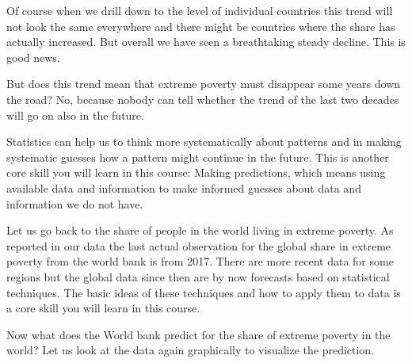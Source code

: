 \documentclass[
  letterpaper,
]{scrbook}
\begin{document}
Of course when we drill down to the level of individual countries this
trend will not look the same everywhere and there might be countries
where the share has actually increased. But overall we have seen a
breathtaking steady decline. This is good news.

But does this trend mean that extreme poverty must disappear some years
down the road? No, because nobody can tell whether the trend of the last
two decades will go on also in the future.

Statistics can help us to think more systematically about patterns and
in making systematic guesses how a pattern might continue in the future.
This is another core skill you will learn in this course: Making
predictions, which means using available data and information to make
informed guesses about data and information we do not have.

Let us go back to the share of people in the world living in extreme
poverty. As reported in our data the last actual observation for the
global share in extreme poverty from the world bank is from 2017. There
are more recent data for some regions but the global data since then are
by now forecasts based on statistical techniques. The basic ideas of
these techniques and how to apply them to data is a core skill you will
learn in this course.

Now what does the World bank predict for the share of extreme poverty in
the world? Let us look at the data again graphically to visualize the
prediction.
\end{document}

